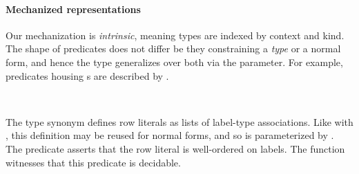 \documentclass[sigplan,screen]{acmart}
\begin{document}
\paragraph{Mechanized representations }
Our mechanization is \emph{intrinsic}, meaning types are indexed by context and kind. The shape of predicates does not differ be they constraining a \emph{type} or a normal form, and hence the  type generalizes over both via the  parameter. For example, predicates housing s are described by  \Symbol{(}  \Constructor{R[}\Constructor{]}\Symbol{)}.
\begin{AgdaAlign}
\begin{code} %
%
\>[2]\AgdaSpace{}%
\AgdaSpace{}%
\AgdaSymbol{(}\AgdaSpace{}%
\AgdaSymbol{:}\AgdaSpace{}%
\AgdaSymbol{)}\AgdaSpace{}%
\AgdaSymbol{:}\AgdaSpace{}%
\<%
\\
%
\>[2]\AgdaSpace{}%
\AgdaSpace{}%
\AgdaSymbol{(}\AgdaSpace{}%
\AgdaSymbol{:}\AgdaSpace{}%
\AgdaSymbol{)}\AgdaSpace{}%
\AgdaSymbol{:}\AgdaSpace{}%
\AgdaSpace{}%
\AgdaSpace{}%
\<%
\end{code}

The type synonym  defines row literals as lists of label-type associations. Like with , this definition may be reused for normal forms, and so is parameterized by . The predicate   asserts that the row literal  is well-ordered on labels. The function  witnesses that this predicate is decidable.



\end{AgdaAlign}
\end{document}
